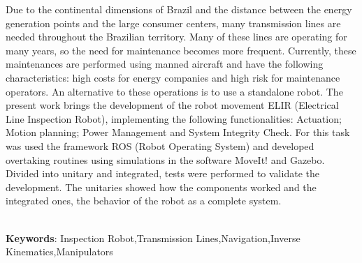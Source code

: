 \begin{thesisabastract}
Due to the continental dimensions of Brazil and the distance between the energy generation points and the large consumer centers, many transmission lines are needed throughout the Brazilian territory. Many of these lines are operating for many years, so the need for maintenance becomes more frequent. Currently, these maintenances are performed using manned aircraft and have the following characteristics: high costs for energy companies and high risk for maintenance operators. An alternative to these operations is to use a standalone robot.
The present work brings the development of the robot movement ELIR (Electrical Line Inspection Robot), implementing the following functionalities: Actuation; Motion planning; Power Management and System Integrity Check. For this task was used the framework ROS (Robot Operating System) and developed overtaking routines using simulations in the software MoveIt! and Gazebo. Divided into unitary and integrated, tests were performed to validate the development. The unitaries showed how the components worked and the integrated ones, the behavior of the robot as a complete system.


\ \\

\textbf{Keywords}: Inspection Robot,Transmission Lines,Navigation,Inverse Kinematics,Manipulators

\end{thesisabastract}
